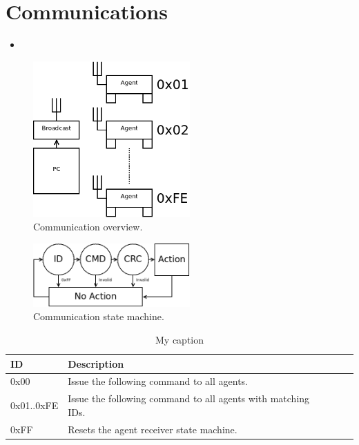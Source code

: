 \documentclass[a4paper]{article}
\begin{document}
\section{Communications}
\begin{itemize}
   \item 
\end{itemize}


\begin{figure}[h]
   \centering
   \label{fig_communications}
   \includegraphics[width=6cm,keepaspectratio]{communications/communications.png} 
   \caption{Communication overview.}
\end{figure}

\begin{figure}[h]
   \centering
   \label{fig_communications_sm}
   \includegraphics[width=6cm,keepaspectratio]{communications/communications_sm.png} 
   \caption{Communication state machine.}
\end{figure}


\begin{table}[h]
   \centering
   \caption{My caption}
   \label{my-label}
   \begin{tabular}{|l|l|l|l|l|l|}
        \hline
        \textbf{ID}  &  \textbf{Description} \\ \hline  
         0x00        &  Issue the following command to all agents.\\ \hline  
         0x01..0xFE  &  Issue the following command to all agents with matching IDs.\\ \hline  
         0xFF        &  Resets the agent receiver state machine. \\ \hline  
   \end{tabular}
\end{table}
\end{document}

